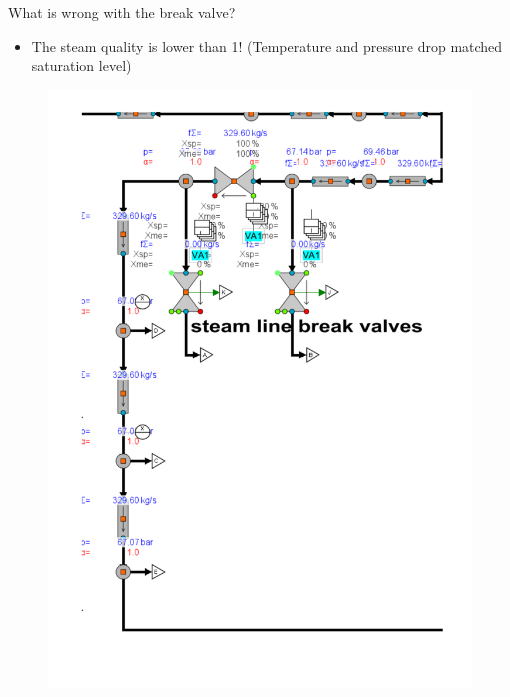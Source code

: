 \begin{frame}{What is wrong with the break valve?}
\begin{figure}
\begin{minipage}{.5\textwidth}
		\end{minipage}
	\end{figure}
	\vspace{-10pt}
	\begin{itemize}
		\item The steam quality is lower than 1! (Temperature and pressure drop matched saturation level)
	\end{itemize}
\end{frame}




\begin{frame}
	\begin{figure}
		\centering
		\begin{minipage}{.5\textwidth}
			\centering
			\includegraphics[width=0.8\linewidth, trim={2cm 15cm 2cm 0cm}, clip]{./graphs/steam_pipe_ss.pdf}
		\end{minipage}%
		\begin{minipage}{.5\textwidth}
			\centering

\end{minipage}
\end{figure}
\end{frame}
